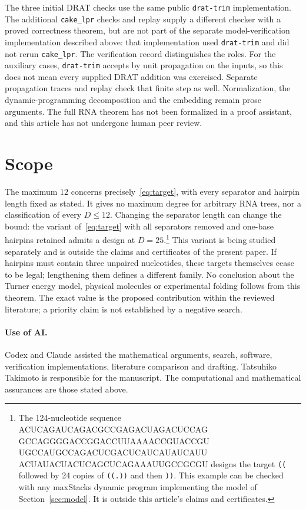 \documentclass[11pt,a4paper]{article}
\theoremstyle{definition}
\begin{document}
The three initial DRAT checks use the same public \texttt{drat-trim}
implementation. The additional \texttt{cake\_lpr} checks and replay
supply a different checker with a proved correctness theorem, but are
not part of the separate model-verification implementation described
above: that implementation used \texttt{drat-trim} and did not rerun
\texttt{cake\_lpr}. The verification record distinguishes the roles.
For the auxiliary cases, \texttt{drat-trim} accepts by unit propagation
on the inputs, so this does not mean every supplied DRAT addition was
exercised. Separate propagation traces and replay check that finite
step as well. Normalization, the dynamic-programming decomposition and
the embedding remain prose arguments. The full RNA theorem has not
been formalized in a proof assistant, and this article has not undergone
human peer review.

\section{Scope}
The maximum $12$ concerns precisely~\eqref{eq:target}, with every
separator and hairpin length fixed as stated. It gives no maximum
degree for arbitrary RNA trees, nor a classification of every
$D\leq12$. Changing the separator length can change the bound: the
variant of~\eqref{eq:target} with all separators removed and one-base
hairpins retained admits a design at $D=25$.\footnote{\raggedright The 124-nucleotide sequence
{\ttfamily\footnotesize
ACUCAGAUCAGACGCCGAGACUAGACUCCAG\allowbreak{}
GCCAGGGGACCGGACCUUAAAACCGUACCGU\allowbreak{}
UGCCAUGCCAGACUCGACUCAUCAUAUCAUU\allowbreak{}
ACUAUACUACUCAGCUCAGAAAUUGCCGCGU}
designs the target \texttt{((} followed by 24 copies of \texttt{((.))} and then \texttt{))}. This example can be checked with any maxStacks dynamic program implementing the model of Section~\ref{sec:model}. It is outside this article's claims and certificates.} This variant is being
studied separately and is outside the claims and certificates of the
present paper. If hairpins must contain three unpaired nucleotides, these
targets themselves cease to be legal; lengthening them defines a
different family. No conclusion about the Turner energy model,
physical molecules or experimental folding follows from this theorem.
The exact value is the proposed contribution within the reviewed
literature; a priority claim is not established by a negative search.

\paragraph{Use of AI.}
Codex and Claude assisted the mathematical arguments, search, software,
verification implementations, literature comparison and drafting.
Tatsuhiko Takimoto is responsible for the manuscript. The computational
and mathematical assurances are those stated above.
\end{document}
